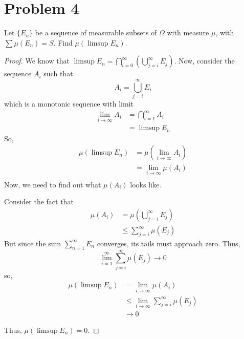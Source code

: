\documentclass[fontsize=11pt]{scrartcl} %
\numberwithin{equation}{section} %
\numberwithin{figure}{section} %
\numberwithin{table}{section} %
\begin{document}
\section*{Problem 4}
Let $\{E_n\}$ be a sequence of measurable subsets of $\Omega$ with measure $\mu$, with
$\sum\mu(E_n) = S$. Find $\mu\left(\limsup E_n\right)$.
\\
\begin{proof}
We know that $\limsup E_n = \bigcap_{i=0}^{\infty}\left(\bigcup_{j=i}^{\infty}E_j\right)$. 
Now, consider the sequence $A_i$ such that 
\[
A_i = \bigcup_{j=i}^{\infty}E_i
\]
which is a monotonic sequence with limit
\[
\begin{aligned}
\lim_{i\to\infty}A_i    &= \bigcap_{i=1}^{\infty}A_i\\
                        &= \limsup E_n
\end{aligned}
\]
So,
\[
\begin{aligned}
\mu\left(\limsup E_n\right) &= \mu\left(\lim_{i\to\infty}A_i\right)\\
                            &= \lim_{i\to\infty}\mu(A_i)\\
\end{aligned}
\]
Now, we need to find out what $\mu(A_i)$ looks like.

Consider the fact that
\[
\begin{aligned}
\mu(A_i)    &= \mu\left(\bigcup_{j=i}^{\infty}E_j\right)\\
            &\leq \sum_{j=i}^{\infty}\mu(E_j)
\end{aligned}
\]
But since the sum $\sum_{n=1}^{\infty}E_n$ converges, its tails must approach zero.
Thus,
\[
\lim_{i=1}^{\infty}\sum_{j=i}^{\infty}\mu(E_j) \to 0
\]
so,
\[
\begin{aligned}
\mu\left(\limsup E_n\right) &= \lim_{i\to\infty}\mu(A_i)\\
                            &\leq \lim_{i\to\infty}\sum_{j=i}^{\infty}\mu(E_j)\\
                            &\to 0
\end{aligned}
\]

Thus, $\mu\left(\limsup E_n\right)= 0$.
\end{proof}
\end{document}
